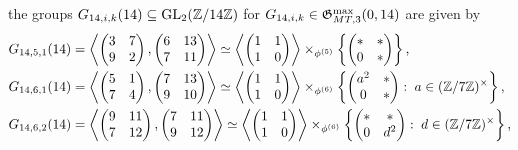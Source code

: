 the groups $G_{14,i,k}(14) \subseteq \operatorname{GL}_2(\mathbb{Z}/14\mathbb{Z})$ for $G_{14,i,k} \in \mathfrak{G}_{MT,3}^{\max}(0,14)$ are given by
\begin{equation} \label{descriptionofgroupslevel14withcubicfibering}
\begin{split}
G_{14,5,1}(14) &= \left\langle \begin{pmatrix} 3 & 7 \\ 9 & 2 \end{pmatrix}, \begin{pmatrix} 6 & 13 \\ 7 & 11 \end{pmatrix} \right\rangle \simeq \left\langle \begin{pmatrix} 1 & 1 \\ 1 & 0 \end{pmatrix} \right\rangle \times_{\phi^{(5)}} \left\{ \begin{pmatrix} * & * \\ 0 & * \end{pmatrix} \right\}, \\
G_{14,6,1}(14) &= \left\langle \begin{pmatrix} 5 & 1 \\ 7 & 4 \end{pmatrix}, \begin{pmatrix} 7 & 13 \\ 9 & 10 \end{pmatrix} \right\rangle \simeq \left\langle \begin{pmatrix} 1 & 1 \\ 1 & 0 \end{pmatrix} \right\rangle \times_{\phi^{(6)}} \left\{ \begin{pmatrix} a^2 & * \\ 0 & * \end{pmatrix} : \; a \in (\mbz/7\mbz)^\times \right\}, \\
G_{14,6,2}(14) &= \left\langle \begin{pmatrix} 9 & 11 \\ 7 & 12 \end{pmatrix}, \begin{pmatrix} 7 & 11 \\ 9 & 12 \end{pmatrix} \right\rangle \simeq \left\langle \begin{pmatrix} 1 & 1 \\ 1 & 0 \end{pmatrix} \right\rangle \times_{\phi^{(6)}} \left\{ \begin{pmatrix} * & * \\ 0 & d^2 \end{pmatrix} : \; d \in (\mbz/7\mbz)^\times \right\}, \\

\end{split}
\end{equation}
